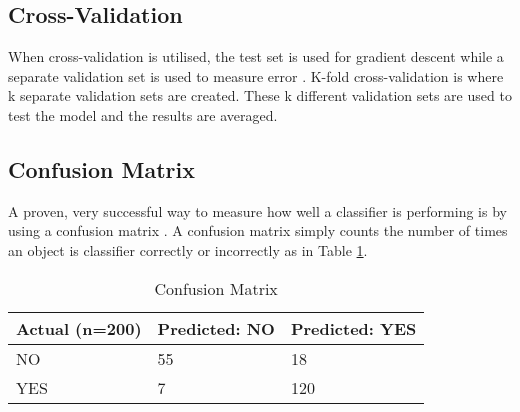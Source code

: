 \tocless\subsection{Cross-Validation}
When cross-validation is utilised, the test set is used for gradient descent while a separate validation set is used to measure error \parencite{MLANN}.
K-fold cross-validation is where k separate validation sets are created.
These k different validation sets are used to test the model and the results are averaged.

\tocless\subsection{Confusion Matrix}
A proven, very successful way to measure how well a classifier is performing is by using a confusion matrix \parencite{handsOnML}.
A confusion matrix simply counts the number of times an object is classifier correctly or incorrectly as in Table \ref{cm}.

\begin{table}[]
\centering
\caption{Confusion Matrix}
\label{cm}
\begin{tabular}{|l|l|l|}
\hline
\textbf{Actual (n=200)} & \textbf{Predicted: NO} & \textbf{Predicted: YES} \\ \hline
NO                      & 55                     & 18                      \\ \hline
YES                     & 7                      & 120                     \\ \hline
\end{tabular}
\end{table}

